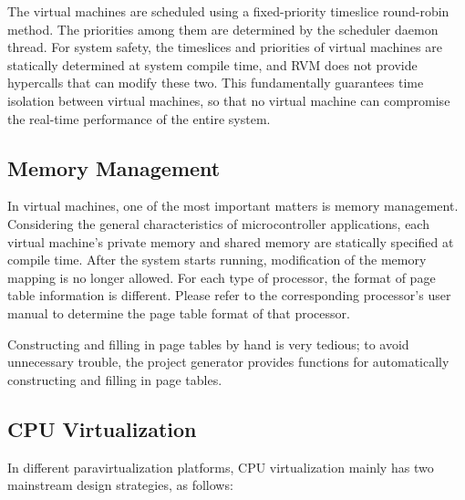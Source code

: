 The virtual machines are scheduled using a fixed-priority timeslice round-robin method. The priorities among them are determined by the scheduler daemon thread. For system safety, the timeslices and priorities of virtual machines are statically determined at system compile time, and RVM does not provide hypercalls that can modify these two. This fundamentally guarantees time isolation between virtual machines, so that no virtual machine can compromise the real-time performance of the entire system.

\subsection{Memory Management}\label{subsec:2-2-2}

In virtual machines, one of the most important matters is memory management. Considering the general characteristics of microcontroller applications, each virtual machine's private memory and shared memory are statically specified at compile time. After the system starts running, modification of the memory mapping is no longer allowed. For each type of processor, the format of page table information is different. Please refer to the corresponding processor's user manual to determine the page table format of that processor.

Constructing and filling in page tables by hand is very tedious; to avoid unnecessary trouble, the project generator provides functions for automatically constructing and filling in page tables.

\subsection{CPU Virtualization}\label{subsec:2-2-3}

In different paravirtualization platforms, CPU virtualization mainly has two mainstream design strategies, as follows:

